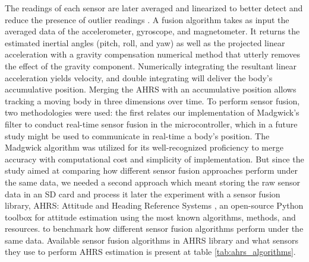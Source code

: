 The readings of each sensor are later averaged and linearized to better detect and reduce the presence of outlier readings \cite{khamphroo2017micropython}. A fusion algorithm takes as input the averaged data of the accelerometer, gyroscope, and magnetometer. It returns the estimated inertial angles (pitch, roll, and yaw) as well as the projected linear acceleration with a gravity compensation numerical method that utterly removes the effect of the gravity component. Numerically integrating the resultant linear acceleration yields velocity, and double integrating will deliver the body's accumulative position. Merging the AHRS with an accumulative position allows tracking a moving body in three dimensions over time. To perform sensor fusion, two methodologies were used: the first relates our implementation of Madgwick's filter to conduct real-time sensor fusion in the microcontroller, which in a future study might be used to communicate in real-time a body's position. The Madgwick algorithm was utilized for its well-recognized proficiency to merge accuracy with computational cost and simplicity of implementation. But since the study aimed at comparing how different sensor fusion approaches perform under the same data, we needed a second approach which meant storing the raw sensor data in an SD card and process it later the experiment with a sensor fusion library, AHRS: Attitude and Heading Reference Systems \cite{ahrs}, an open-source Python toolbox for attitude estimation using the most known algorithms, methods, and resources. to benchmark how different sensor fusion algorithms perform under the same data. Available sensor fusion algorithms in AHRS library and what sensors they use to perform AHRS estimation is present at table \ref{tab:ahrs_algorithms}.


